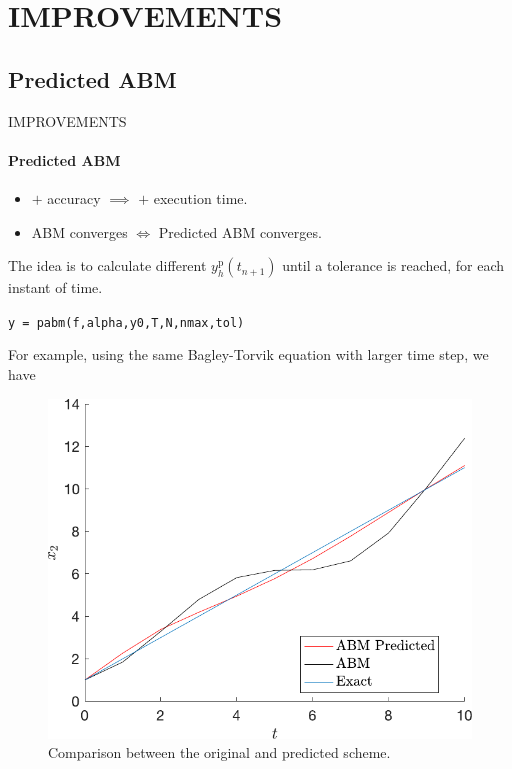 \section{IMPROVEMENTS}
\subsection{Predicted ABM}
\begin{frame}{IMPROVEMENTS}
\framesubtitle{Predicted ABM}
\begin{itemize}
    \item $+$ accuracy $\implies$ $+$ execution time.
    \item ABM converges $\iff$ Predicted ABM converges.
\end{itemize}
    The idea is to calculate different $y _ { h } ^ { \mathrm { p } } \left( t _ { n + 1 } \right)$ until a tolerance is reached, for each instant of time. 
    \begin{center}
    \texttt{y = pabm(f,alpha,y0,T,N,nmax,tol)}
    \end{center}
    For example, using the same Bagley-Torvik equation with larger time step, we have
    \begin{figure}[H]
    \centering
    \includegraphics[scale=0.44]{files/mejoras/comparPredictedABM.pdf}
    \caption{Comparison between the original and predicted scheme.}
    \label{fig:comparBagleyTorvik}
\end{figure}
\end{frame}

